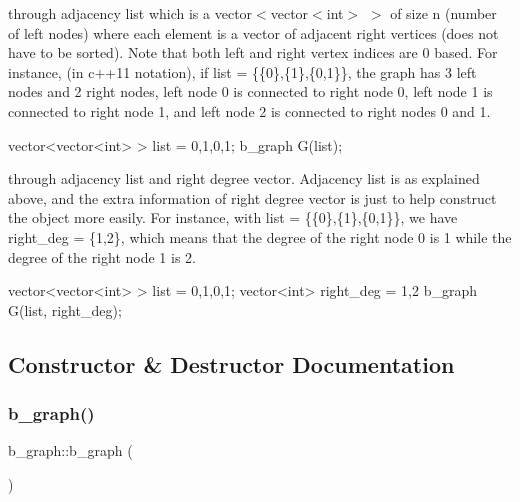 \begin{DoxyEnumerate}
\item through adjacency list which is a vector$<$vector$<$int$>$ $>$ of size n (number of left nodes) where each element is a vector of adjacent right vertices (does not have to be sorted). Note that both left and right vertex indices are 0 based. For instance, (in c++11 notation), if list = \{\{0\},\{1\},\{0,1\}\}, the graph has 3 left nodes and 2 right nodes, left node 0 is connected to right node 0, left node 1 is connected to right node 1, and left node 2 is connected to right nodes 0 and 1. \begin{DoxyVerb}vector<vector<int> > list = {{0},{1},{0,1}};
b_graph G(list);
\end{DoxyVerb}

\item through adjacency list and right degree vector. Adjacency list is as explained above, and the extra information of right degree vector is just to help construct the object more easily. For instance, with list = \{\{0\},\{1\},\{0,1\}\}, we have right\+\_\+deg = \{1,2\}, which means that the degree of the right node 0 is 1 while the degree of the right node 1 is 2. \begin{DoxyVerb}vector<vector<int> > list = {{0},{1},{0,1}};
vector<int> right_deg = {1,2}
b_graph G(list, right_deg);\end{DoxyVerb}
 
\end{DoxyEnumerate}

\subsection{Constructor \& Destructor Documentation}
\mbox{\label{classb__graph_a83ebab7ff22a3cf19c0cf62de3f8b306}} 
\subsubsection{\texorpdfstring{b\+\_\+graph()}{b\_graph()}\hspace{0.1cm}{\footnotesize\ttfamily [1/4]}}
{\footnotesize\ttfamily b\+\_\+graph\+::b\+\_\+graph (\begin{DoxyParamCaption}{ }\end{DoxyParamCaption})\hspace{0.3cm}{\ttfamily [inline]}}



